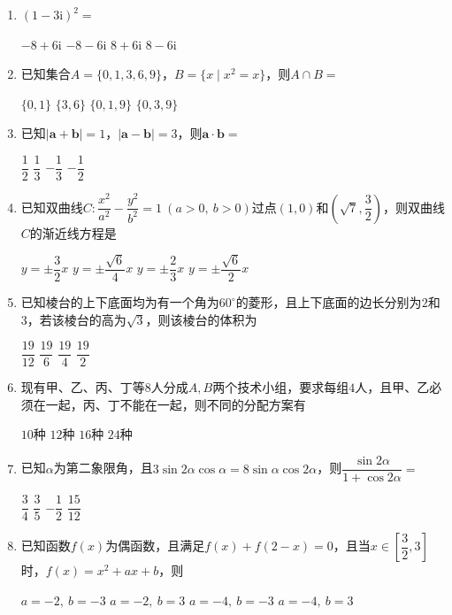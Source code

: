 \documentclass[12pt,a4paper]{article}
\begin{document}
	\begin{enumerate}[leftmargin=*,label=\arabic*.,itemsep=0.8ex]
		\item $(1-3\mathrm{i})^2=$
		\begin{choicesFour}
			\choice $-8+6\mathrm{i}$ \choice $-8-6\mathrm{i}$ \choice $8+6\mathrm{i}$ \choice $8-6\mathrm{i}$
		\end{choicesFour}
		\item 已知集合$A=\{0,1,3,6,9\}$，$B=\{x\mid x^2=x\}$，则$A\cap B=$
		\begin{choicesFour}
			\choice $\{0,1\}$ \choice $\{3,6\}$ \choice $\{0,1,9\}$ \choice $\{0,3,9\}$
		\end{choicesFour}
		\item 已知$|\boldsymbol{a}+\boldsymbol{b}|=1$，$|\boldsymbol{a}-\boldsymbol{b}|=3$，则$\boldsymbol{a}\cdot\boldsymbol{b}=$
		\begin{choicesFour}
			\choice $\dfrac12$ \choice $\dfrac13$ \choice $-\dfrac13$ \choice $-\dfrac12$
		\end{choicesFour}
		\item 已知双曲线$C:\dfrac{x^2}{a^2}-\dfrac{y^2}{b^2}=1\ (a>0,\ b>0)$过点$(1,0)$和$\left(\sqrt7,\dfrac32\right)$，则双曲线$C$的渐近线方程是
		\begin{choicesFour}
			\choice $y=\pm\dfrac32 x$ \choice $y=\pm\dfrac{\sqrt6}{4}x$ \choice $y=\pm\dfrac23 x$ \choice $y=\pm\dfrac{\sqrt6}{2}x$
		\end{choicesFour}
		\item 已知棱台的上下底面均为有一个角为$60^\circ$的菱形，且上下底面的边长分别为$2$和$3$，若该棱台的高为$\sqrt3$，则该棱台的体积为
		\begin{choicesFour}
			\choice $\dfrac{19}{12}$ \choice $\dfrac{19}{6}$ \choice $\dfrac{19}{4}$ \choice $\dfrac{19}{2}$
		\end{choicesFour}
		\item 现有甲、乙、丙、丁等$8$人分成$A,B$两个技术小组，要求每组$4$人，且甲、乙必须在一起，丙、丁不能在一起，则不同的分配方案有
		\begin{choicesFour}
			\choice $10$种 \choice $12$种 \choice $16$种 \choice $24$种
		\end{choicesFour}
		\item 已知$\alpha$为第二象限角，且$3\sin2\alpha\cos\alpha=8\sin\alpha\cos2\alpha$，则$\dfrac{\sin2\alpha}{1+\cos2\alpha}=$
		\begin{choicesFour}
			\choice $\dfrac34$ \choice $\dfrac35$ \choice $-\dfrac12$ \choice $\dfrac{15}{12}$
		\end{choicesFour}
		\item 已知函数$f(x)$为偶函数，且满足$f(x)+f(2-x)=0$，且当$x\in\left[\dfrac32,3\right]$时，$f(x)=x^2+ax+b$，则
		\begin{choicesFour}
			\choice $a=-2,\ b=-3$ \choice $a=-2,\ b=3$ \choice $a=-4,\ b=-3$ \choice $a=-4,\ b=3$
		\end{choicesFour}
	\end{enumerate}
\end{document}
